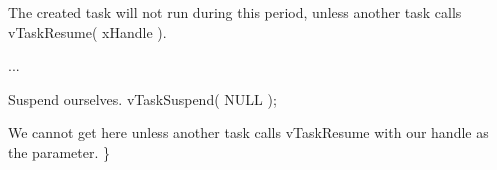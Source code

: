 \begin{DoxyPre}The created task will not run during this period, unless
another task calls vTaskResume( xHandle ).\end{DoxyPre}



\begin{DoxyPre}...\end{DoxyPre}



\begin{DoxyPre}Suspend ourselves.
     vTaskSuspend( NULL );\end{DoxyPre}



\begin{DoxyPre}We cannot get here unless another task calls vTaskResume
with our handle as the parameter.
 \}
   \end{DoxyPre}
 